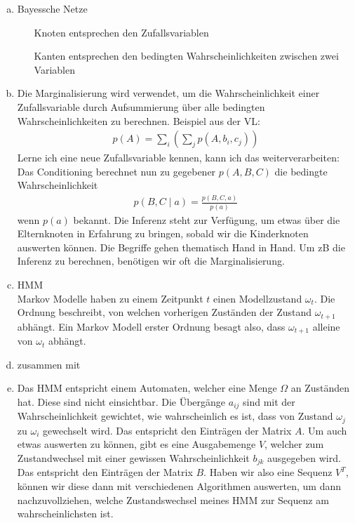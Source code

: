 \begin{aufgabe}
\end{aufgabe}

\begin{enumerate}[a)] 
	\item Bayessche Netze
	\begin{itemize}
		\item[Knoten] entsprechen den Zufallsvariablen
		\item[Kanten] entsprechen den bedingten Wahrscheinlichkeiten zwischen zwei Variablen
	\end{itemize}	
	\item Die Marginalisierung wird verwendet, um die Wahrscheinlichkeit einer Zufallsvariable durch Aufsummierung über alle bedingten Wahrscheinlichkeiten zu berechnen. Beispiel aus der VL:
	\begin{align*}
	p(A) = \sum_{i} \left(\sum_{j} p(A,b_i,c_j)\right)
	\end{align*}
	Lerne ich eine neue Zufallsvariable kennen, kann ich das weiterverarbeiten: Das Conditioning berechnet nun zu gegebener $p(A,B,C)$ die bedingte Wahrscheinlichkeit
	\begin{align*}
	p(B,C\mid a) = \frac{p(B,C,a)}{p(a)}
	\end{align*}
	wenn $p(a)$ bekannt. Die Inferenz steht zur Verfügung, um etwas über die Elternknoten in Erfahrung zu bringen, sobald wir die Kinderknoten auswerten können. Die Begriffe gehen thematisch Hand in Hand. Um zB die Inferenz zu berechnen, benötigen wir oft die Marginalisierung.
	\item HMM\\
	Markov Modelle haben zu einem Zeitpunkt $t$ einen Modellzustand $\omega_{t}$. Die Ordnung beschreibt, von welchen vorherigen Zuständen der Zustand $\omega_{t+1}$ abhängt. Ein Markov Modell erster Ordnung besagt also, dass $\omega_{t+1}$ alleine von $\omega_{t}$ abhängt.
	\item zusammen mit 
	\item Das HMM entspricht einem Automaten, welcher eine Menge $\Omega$ an Zuständen hat. Diese sind nicht einsichtbar. Die Übergänge $a_{ij}$ sind mit der Wahrscheinlichkeit gewichtet, wie wahrscheinlich es ist, dass von Zustand $\omega_j$ zu $\omega_i$ gewechselt wird. Das entspricht den Einträgen der Matrix $A$. Um auch etwas auswerten zu können, gibt es eine Ausgabemenge $V$, welcher zum Zustandwechsel mit einer gewissen Wahrscheinlichkeit $b_{jk}$ ausgegeben wird. Das entspricht den Einträgen der Matrix $B$. Haben wir also eine Sequenz $V^T$, können wir diese dann mit verschiedenen Algorithmen auswerten, um dann nachzuvollziehen, welche Zustandswechsel meines HMM zur Sequenz am wahrscheinlichsten ist.

\end{enumerate}

